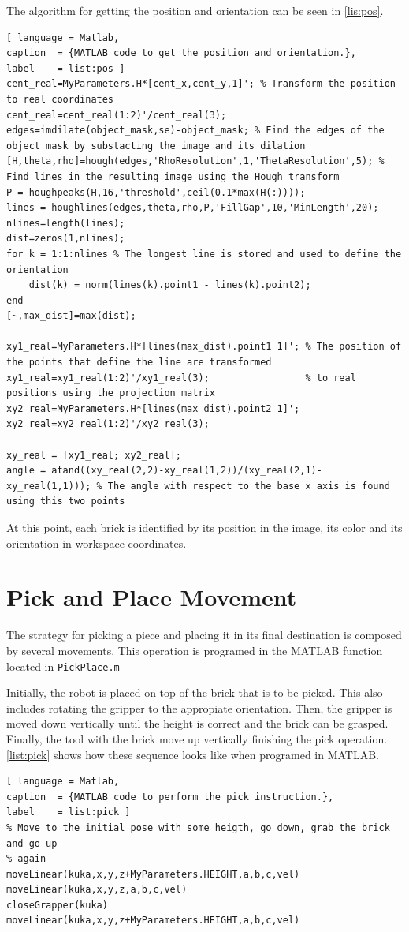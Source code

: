 The algorithm for getting the position and orientation can be seen in \autoref{lis:pos}.
%
\begin{lstlisting}[ language = Matlab,
caption  = {MATLAB code to get the position and orientation.},
label    = list:pos ]
cent_real=MyParameters.H*[cent_x,cent_y,1]'; % Transform the position to real coordinates
cent_real=cent_real(1:2)'/cent_real(3);
edges=imdilate(object_mask,se)-object_mask; % Find the edges of the object mask by substacting the image and its dilation
[H,theta,rho]=hough(edges,'RhoResolution',1,'ThetaResolution',5); % Find lines in the resulting image using the Hough transform
P = houghpeaks(H,16,'threshold',ceil(0.1*max(H(:))));
lines = houghlines(edges,theta,rho,P,'FillGap',10,'MinLength',20);
nlines=length(lines);
dist=zeros(1,nlines);
for k = 1:1:nlines % The longest line is stored and used to define the orientation
    dist(k) = norm(lines(k).point1 - lines(k).point2);
end
[~,max_dist]=max(dist);

xy1_real=MyParameters.H*[lines(max_dist).point1 1]'; % The position of the points that define the line are transformed
xy1_real=xy1_real(1:2)'/xy1_real(3);                 % to real positions using the projection matrix
xy2_real=MyParameters.H*[lines(max_dist).point2 1]';
xy2_real=xy2_real(1:2)'/xy2_real(3);

xy_real = [xy1_real; xy2_real];
angle = atand((xy_real(2,2)-xy_real(1,2))/(xy_real(2,1)-xy_real(1,1))); % The angle with respect to the base x axis is found using this two points
\end{lstlisting}

At this point, each brick is identified by its position in the image, its color and its orientation in workspace coordinates.

\section{Pick and Place Movement}
The strategy for picking a piece and placing it in its final destination is composed by several movements. This operation is programed in the MATLAB function located in \lstinline[style=matlabinline]{PickPlace.m}

Initially, the robot is placed on top of the brick that is to be picked. This also includes rotating the gripper to the appropiate orientation. Then, the gripper is moved down vertically until the height is correct and the brick can be grasped. Finally, the tool with the brick move up vertically finishing the pick operation. \autoref{list:pick} shows how these sequence looks like when programed in MATLAB.
%
\begin{lstlisting}[ language = Matlab,
caption  = {MATLAB code to perform the pick instruction.},
label    = list:pick ]
% Move to the initial pose with some heigth, go down, grab the brick and go up
% again
moveLinear(kuka,x,y,z+MyParameters.HEIGHT,a,b,c,vel)
moveLinear(kuka,x,y,z,a,b,c,vel)
closeGrapper(kuka)
moveLinear(kuka,x,y,z+MyParameters.HEIGHT,a,b,c,vel)
\end{lstlisting}

